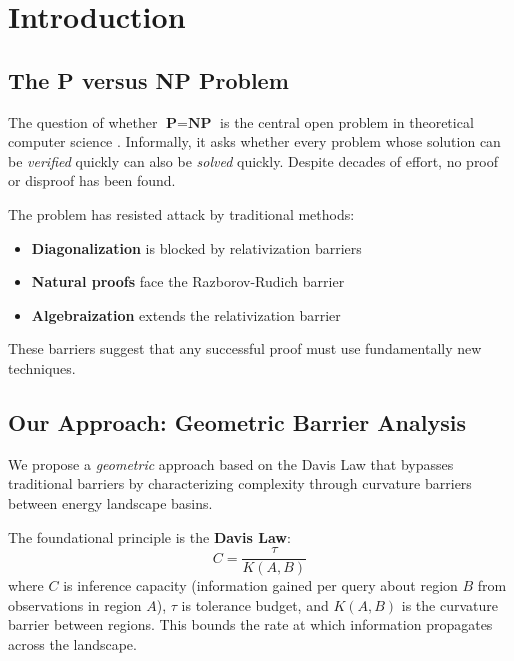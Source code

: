 \documentclass[11pt,a4paper]{article}
\theoremstyle{plain}
\theoremstyle{definition}
\theoremstyle{remark}
\newcommand{\NP}{\textbf{NP}}
\newcommand{\PP}{\textbf{P}}
\begin{document}
\tableofcontents
\newpage

\section{Introduction}

\subsection{The P versus NP Problem}

The question of whether $\PP = \NP$ is the central open problem in theoretical computer science \cite{cook1971}. Informally, it asks whether every problem whose solution can be \emph{verified} quickly can also be \emph{solved} quickly. Despite decades of effort, no proof or disproof has been found.

The problem has resisted attack by traditional methods:
\begin{itemize}
    \item \textbf{Diagonalization} is blocked by relativization barriers \cite{baker1975}
    \item \textbf{Natural proofs} face the Razborov-Rudich barrier \cite{razborov1997}
    \item \textbf{Algebraization} extends the relativization barrier \cite{aaronson2009}
\end{itemize}

These barriers suggest that any successful proof must use fundamentally new techniques.

\subsection{Our Approach: Geometric Barrier Analysis}

We propose a \emph{geometric} approach based on the Davis Law that bypasses traditional barriers by characterizing complexity through curvature barriers between energy landscape basins.

The foundational principle is the \textbf{Davis Law}:
\begin{equation}
    C = \frac{\tau}{K(A,B)}
\end{equation}
where $C$ is inference capacity (information gained per query about region $B$ from observations in region $A$), $\tau$ is tolerance budget, and $K(A,B)$ is the curvature barrier between regions. This bounds the rate at which information propagates across the landscape.
\end{document}
